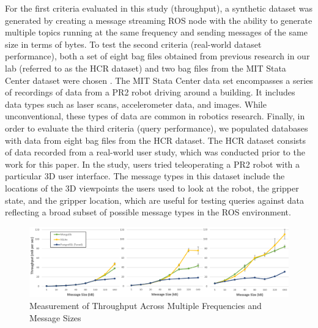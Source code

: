 \documentclass[nocopyrightspace]{acm_proc_article-sp}
\begin{document}
For the first criteria evaluated in this study (throughput), a synthetic dataset was generated by creating a message streaming ROS node with the ability to generate multiple topics running at the same frequency and sending messages of the same size in terms of bytes. To test the second criteria (real-world dataset performance), both a set of eight bag files obtained from previous research in our lab (referred to as the HCR dataset) and two bag files from the MIT Stata Center dataset were chosen \cite{fallon2013stata}. The MIT Stata Center data set encompasses a series of recordings of data from a PR2 robot driving around a building. It includes data types such as laser scans, accelerometer data, and images. While unconventional, these types of data are common in robotics research. Finally, in order to evaluate the third criteria (query performance), we populated databases with data from eight bag files from the HCR dataset. The HCR dataset consists of data recorded from a real-world user study, which was conducted prior to the work for this paper. In the study, users tried teleoperating a PR2 robot with a particular 3D user interface. The message types in this dataset include the locations of the 3D viewpoints the users used to look at the robot, the gripper state, and the gripper location, which are useful for testing queries against data reflecting a broad subset of possible message types in the ROS environment.

\begin{figure}
    \centering
    \includegraphics[width=\linewidth]{images/throughput}
    \caption{Measurement of Throughput Across Multiple Frequencies and Message Sizes}
    \label{fig:throughput}
\end{figure}
\end{document}
